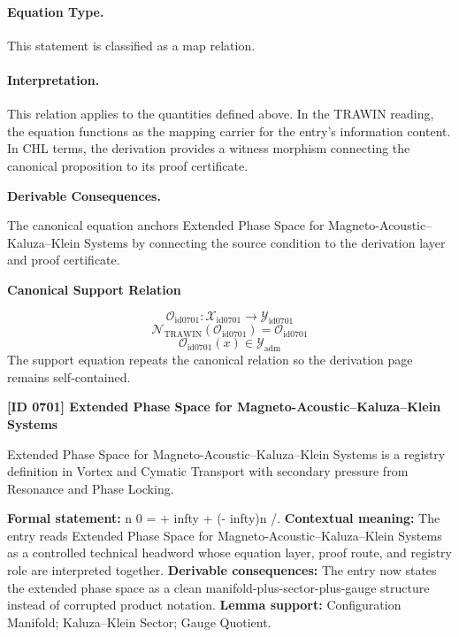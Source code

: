 \paragraph{Equation Type.}
This statement is classified as a map relation.

\paragraph{Interpretation.}
This relation applies to the quantities defined above. In the TRAWIN reading, the equation functions as the mapping carrier for the entry’s information content. In CHL terms, the derivation provides a witness morphism connecting the canonical proposition to its proof certificate.

\par\vspace{0.35em}
\noindent\textbf{Derivable Consequences.}\quad
\begingroup
\footnotesize
\raggedright
The canonical equation anchors Extended Phase Space for Magneto-Acoustic--Kaluza--Klein Systems by connecting the source condition to the derivation layer and proof certificate.
\par\endgroup

\noindent\textbf{Canonical Support Relation}\par
\[
\mathcal{O}_{\mathrm{id0701}}:\mathcal{X}_{\mathrm{id0701}}\longrightarrow\mathcal{Y}_{\mathrm{id0701}}
\]
\[
\mathcal{N}_{\mathrm{TRAWIN}}(\mathcal{O}_{\mathrm{id0701}})=\mathcal{O}_{\mathrm{id0701}}
\]
\[
\mathcal{O}_{\mathrm{id0701}}(x)\in\mathcal{Y}_{\mathrm{adm}}
\]
\noindent The support equation repeats the canonical relation so the derivation page remains self-contained.\par

\clearpage
\noindent\textbf{[ID 0701] Extended Phase Space for Magneto-Acoustic--Kaluza--Klein Systems}\par
\vspace{0.35em}
\begingroup\small
{}
Extended Phase Space for Magneto-Acoustic--Kaluza--Klein Systems is a registry definition in Vortex and Cymatic Transport with secondary pressure from Resonance and Phase Locking.

\begingroup\footnotesize\setlength{\emergencystretch}{3em}\sloppy
\textbf{Formal statement:} n 0 = + infty + (- infty)n /. \textbf{Contextual meaning:} The entry reads Extended Phase Space for Magneto-Acoustic--Kaluza--Klein Systems as a controlled technical headword whose equation layer, proof route, and registry role are interpreted together. \textbf{Derivable consequences:} The entry now states the extended phase space as a clean manifold-plus-sector-plus-gauge structure instead of corrupted product notation. \textbf{Lemma support:} Configuration Manifold; Kaluza--Klein Sector; Gauge Quotient.\par
\endgroup

